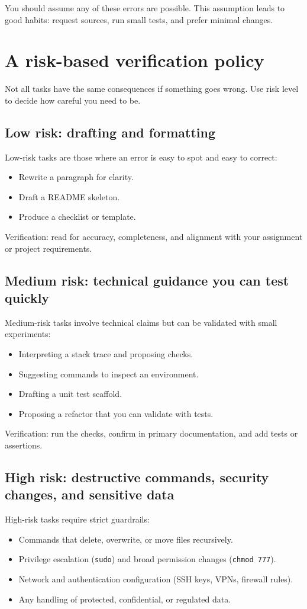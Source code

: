 You should assume any of these errors are possible. This assumption leads to good habits: request sources, run small tests, and prefer minimal changes.

\section{A risk-based verification policy}
Not all tasks have the same consequences if something goes wrong. Use risk level to decide how careful you need to be.

\subsection{Low risk: drafting and formatting}
Low-risk tasks are those where an error is easy to spot and easy to correct:
\begin{itemize}[noitemsep]
  \item Rewrite a paragraph for clarity.
  \item Draft a README skeleton.
  \item Produce a checklist or template.
\end{itemize}

Verification: read for accuracy, completeness, and alignment with your assignment or project requirements.

\subsection{Medium risk: technical guidance you can test quickly}
Medium-risk tasks involve technical claims but can be validated with small experiments:
\begin{itemize}[noitemsep]
  \item Interpreting a stack trace and proposing checks.
  \item Suggesting commands to inspect an environment.
  \item Drafting a unit test scaffold.
  \item Proposing a refactor that you can validate with tests.
\end{itemize}

Verification: run the checks, confirm in primary documentation, and add tests or assertions.

\subsection{High risk: destructive commands, security changes, and sensitive data}
High-risk tasks require strict guardrails:
\begin{itemize}[noitemsep]
  \item Commands that delete, overwrite, or move files recursively.
  \item Privilege escalation (\texttt{sudo}) and broad permission changes (\texttt{chmod 777}).
  \item Network and authentication configuration (SSH keys, VPNs, firewall rules).
  \item Any handling of protected, confidential, or regulated data.
\end{itemize}

